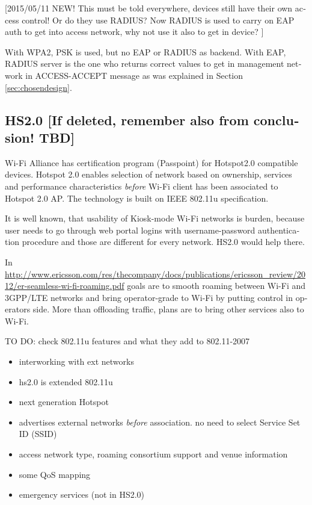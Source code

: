 \documentclass[12pt,a4paper,english]{tutthesis}
\begin{document}
\begin{otherlanguage}{english}
[2015/05/11 NEW! This must be told everywhere, devices still have their own access
control! Or do they use RADIUS? Now RADIUS is used to carry on EAP auth to get into access
network, why not use it also to get in device? ]

With WPA2, PSK is used, but no EAP or RADIUS as backend.  With EAP,
RADIUS server is the one who returns correct values to get in
management network in ACCESS-ACCEPT message as was
explained in Section \ref{sec:chosendesign}.


\subsection{HS2.0 [If deleted, remember also from conclusion! TBD]}
\label{sec-4-5-1}

Wi-Fi Alliance has certification program (Passpoint) for Hotspot2.0 compatible
devices.  Hotspot 2.0 enables selection of network based on ownership,
services and performance characteristics \emph{before} Wi-Fi client has
been associated to Hotspot 2.0 AP. The technology is built on
IEEE 802.11u specification.




It is well known, that usability of Kiosk-mode Wi-Fi
 networks is burden, because user needs to go through 
web portal logins with username-password authentication 
procedure and those are different for every network.
HS2.0 would help there.

In 
\url{http://www.ericsson.com/res/thecompany/docs/publications/ericsson_review/2012/er-seamless-wi-fi-roaming.pdf}
goals are to smooth roaming between Wi-Fi and 3GPP/LTE networks
and bring operator-grade to Wi-Fi by putting control in operators side. More
than offloading traffic, plans are to bring other services also to Wi-Fi.

TO DO: check 802.11u features and what they add to 802.11-2007
\begin{itemize}
\item interworking with ext networks
\item hs2.0 is extended 802.11u
\item next generation Hotspot
\item advertises external networks \emph{before} association. no need to
select Service Set ID (SSID)
\item access network type, roaming consortium support and venue information
\item some QoS mapping
\item emergency services (not in HS2.0)
\end{itemize}



\end{otherlanguage}
\end{document}
